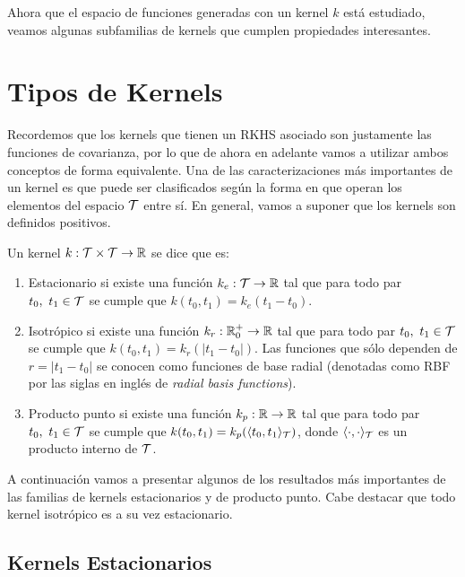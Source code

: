 Ahora que el espacio de funciones generadas con un kernel \(k\) está estudiado, veamos algunas subfamilias de kernels que cumplen propiedades interesantes.

\section{Tipos de Kernels}

Recordemos que los kernels que tienen un RKHS asociado son justamente las funciones de covarianza, por lo que de ahora en adelante vamos a utilizar ambos conceptos de forma equivalente. Una de las caracterizaciones más importantes de un kernel es que puede ser clasificados según la forma en que operan los elementos del espacio \(\mathcal{T}\) entre sí. En general, vamos a suponer que los kernels son definidos positivos.

\begin{definition}
	Un kernel \(k : \mathcal{T} \times \mathcal{T} \to \mathbb{R}\) se dice que es:
	\begin{enumerate}
		\item Estacionario si existe una función \(k_{e} : \mathcal{T} \to \mathbb{R}\) tal que para todo par \(t_{0}, \ t_{1} \in \mathcal{T}\) se cumple que \(k(t_{0}, t_{1}) = k_{e}(t_{1} - t_{0})\).
		\item Isotrópico si existe una función \(k_{r} : \mathbb{R}_{0}^{+} \to \mathbb{R}\) tal que para todo par \(t_{0}, \ t_{1} \in \mathcal{T}\) se cumple que \(k(t_{0}, t_{1}) = k_{r}(\vert t_{1} - t_{0}\vert)\). Las funciones que sólo dependen de \(r = \vert t_{1} - t_{0}\vert\) se conocen como funciones de base radial (denotadas como RBF por las siglas en inglés de \emph{radial basis functions}).
		\item Producto punto si existe una función \(k_{p} : \mathbb{R} \to \mathbb{R}\) tal que para todo par \(t_{0}, \ t_{1} \in \mathcal{T}\) se cumple que \(k(t_{0}, t_{1}) = k_{p}(\langle t_{0}, t_{1}\rangle_{\mathcal{T}})\), donde \(\langle \cdot, \cdot \rangle_{\mathcal{T}}\) es un producto interno de \(\mathcal{T}\).
	\end{enumerate}
\end{definition}

A continuación vamos a presentar algunos de los resultados más importantes de las familias de kernels estacionarios y de producto punto. Cabe destacar que todo kernel isotrópico es a su vez estacionario.

\subsection{Kernels Estacionarios}

